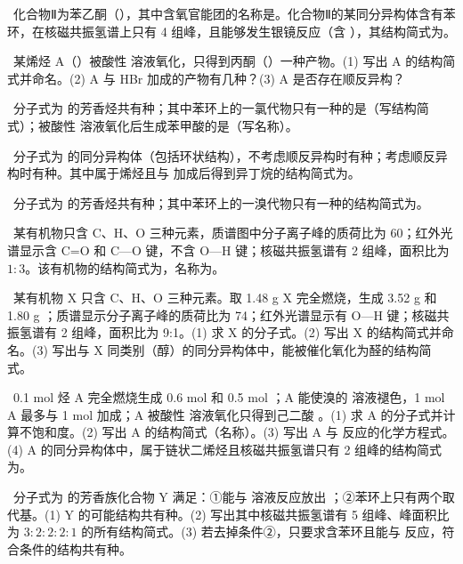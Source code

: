 \begin{xiti}
\item {}\ 化合物Ⅱ为苯乙酮（），其中含氧官能团的名称是\tk。化合物Ⅱ的某同分异构体含有苯环，在核磁共振氢谱上只有 4 组峰，且能够发生银镜反应（含 ），其结构简式为\tk。

\item {}\ 某烯烃 A（）被酸性  溶液氧化，只得到丙酮（）一种产物。(1) 写出 A 的结构简式并命名。(2) A 与 HBr 加成的产物有几种？(3) A 是否存在顺反异构？

\item {}\ 分子式为  的芳香烃共有\tk{}种；其中苯环上的一氯代物只有一种的是\tk（写结构简式）；被酸性  溶液氧化后生成苯甲酸的是\tk（写名称）。

\item {}\ 分子式为  的同分异构体（包括环状结构），不考虑顺反异构时有\tk{}种；考虑顺反异构时有\tk{}种。其中属于烯烃且与  加成后得到异丁烷的结构简式为\tk。

\item {}\ 分子式为  的芳香烃共有\tk{}种；其中苯环上的一溴代物只有一种的结构简式为\tk。

\item {}\ 某有机物只含 C、H、O 三种元素，质谱图中分子离子峰的质荷比为 60；红外光谱显示含 C=O 和 C—O 键，不含 O—H 键；核磁共振氢谱有 2 组峰，面积比为 $1:3$。该有机物的结构简式为\tk，名称为\tk。
\end{xiti}

\begin{xiti}
\item {}\ 某有机物 X 只含 C、H、O 三种元素。取 1.48 g X 完全燃烧，生成 3.52 g  和 1.80 g ；质谱显示分子离子峰的质荷比为 74；红外光谱显示有 O—H 键；核磁共振氢谱有 2 组峰，面积比为 9:1。(1) 求 X 的分子式。(2) 写出 X 的结构简式并命名。(3) 写出与 X 同类别（醇）的同分异构体中，能被催化氧化为醛的结构简式。

\item {}\ 0.1 mol 烃 A 完全燃烧生成 0.6 mol  和 0.5 mol ；A 能使溴的  溶液褪色，1 mol A 最多与 1 mol  加成；A 被酸性  溶液氧化只得到己二酸 。(1) 求 A 的分子式并计算不饱和度。(2) 写出 A 的结构简式（名称）。(3) 写出 A 与  反应的化学方程式。(4) A 的同分异构体中，属于链状二烯烃且核磁共振氢谱只有 2 组峰的结构简式为\tk。

\item {}\ 分子式为  的芳香族化合物 Y 满足：①能与  溶液反应放出 ；②苯环上只有两个取代基。(1) Y 的可能结构共有\tk{}种。(2) 写出其中核磁共振氢谱有 5 组峰、峰面积比为 $3:2:2:2:1$ 的所有结构简式。(3) 若去掉条件②，只要求含苯环且能与  反应，符合条件的结构共有\tk{}种。
\end{xiti}

